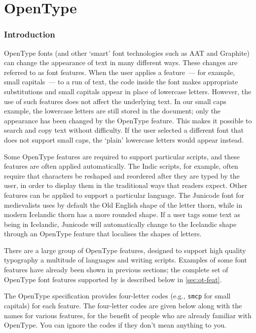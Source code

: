\documentclass[a4paper]{l3doc}
\begin{document}
\part{OpenType}
\label{sec:opentype-features}

\section{Introduction}
\label{sec:opentype-features-intro}

OpenType fonts (and other `smart' font technologies such as AAT and Graphite) can change the appearance of text in many different ways.
These changes are referred to as font features.
When the user applies a feature~--- for example, small capitals~--- to a run of text, the code inside the font makes appropriate substitutions and small capitals appear in place of lowercase letters.
However, the use of such features does not affect the underlying text.
In our small caps example, the lowercase letters are still stored in the document; only the appearance has been changed by the OpenType feature.
This makes it possible to search and copy text without difficulty.
If the user selected a different font that does not support small caps, the `plain' lowercase letters would appear instead.

Some OpenType features are required to support particular scripts, and these features are often applied automatically.
The Indic scripts, for example, often require that characters be reshaped and reordered after they are typed by the user, in order to display them in the traditional ways that readers expect.
Other features can be applied to support a particular language.
The Junicode font for medievalists uses by default the Old English shape of the letter thorn, while in modern Icelandic thorn has a more rounded shape.
If a user tags some text as being in Icelandic, Junicode will automatically change to the Icelandic shape through an OpenType feature that localises the shapes of letters.

There are a large group of OpenType features, designed to support high quality typography a multitude of languages and writing scripts.
Examples of some font features have already been shown in previous sections; the complete set of OpenType font features supported by  is described below in \ref{sec:ot-feat}.

The OpenType specification provides four-letter codes (e.g., \texttt{smcp} for small capitals) for each feature.  The four-letter codes are given below along with the  names for various features, for the benefit of people who are already familiar with OpenType.  You can ignore the codes if they don't mean anything to you.
\end{document}
